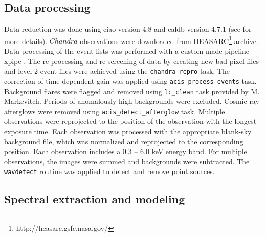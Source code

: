 \documentclass[iop]{emulateapj}
\begin{document}
\subsection{Data processing}

Data reduction was done using {\sc ciao} version 4.8 and {\sc caldb} version 4.7.1 (see \citealt{Babyk:17scal, Hogan:17} for more details).  $Chandra$ observations were downloaded from HEASARC\footnote{http://heasarc.gsfc.nasa.gov/} archive.  Data processing of the event lists was performed with a custom-made pipeline {\sc xpipe} \citep{Fruscione:06}. The re-processing and re-screening of data by creating new bad pixel files and level 2 event files were achieved using the \texttt{chandra\_repro} task. The correction of time-dependent gain was applied using \texttt{acis\_process\_events} task. Background flares were flagged and removed using \texttt{lc\_clean} task provided by M. Markevitch. Periods of anomalously high backgrounds were excluded. Cosmic ray afterglows were removed using \texttt{acis\_detect\_afterglow} task.  Multiple observations were reprojected to the position of the observation with the longest exposure time. Each observation was processed with the appropriate blank-sky background file, which was normalized and reprojected to the corresponding position.  Each observation includes a 0.3 -- 6.0 keV energy band. For multiple observations, the images were summed and backgrounds were subtracted.  The \texttt{wavdetect} routine was applied to detect and remove point sources. 

\subsection{Spectral extraction and modeling}

\end{document}
